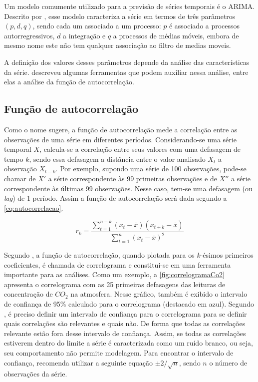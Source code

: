 \documentclass[
    12pt,
    oneside,
    a4paper,
    english,
    brazil
]{abntex2}
\begin{document}
Um modelo comumente utilizado para a  previsão de séries temporais é o ARIMA\@.
Descrito por  , esse  modelo caracteriza a  série em  termos de
três  parâmetros $(p,d,q)$,  sendo  cada  um associado  a  um  processo: $p$  é
associado a processos  autorregressivos, $d$ a integração e $q$  a processos de
médias móveis, embora de mesmo nome  este não tem qualquer associação ao filtro
de medias moveis.

A   definição  dos   valores   desses  parâmetros   depende   da  análise   das
características da  série.   descreveu algumas  ferramentas que
podem auxiliar nessa análise, entre elas a análise da função de autocorrelação.

\subsection{Função de autocorrelação}\label{sec:corre}

Como  o nome  sugere, a  função de  autocorrelação mede  a correlação  entre as
observações  de uma  série em  diferentes períodos.  Considerando-se uma  série
temporal $X$, calcula-se  a correlação entre seus valores com  uma defasagem de
tempo $k$,  sendo essa defasagem  a distância entre  o valor analisado  $X_t$ a
observação  $X_{t-k}$.  Por exemplo,  supondo  uma  série de  100  observações,
pode-se chamar de $X'$ a série  correspondente às 99 primeiras observações e de
$X''$ a série correspondente às últimas  99 observações. Nesse caso, tem-se uma
defasagem (ou \textit{lag}) de 1 período. Assim a função de autocorrelação será
dada segundo a \autoref{eq:autocorrelacao}.

\begin{equation}
    \label{eq:autocorrelacao}
    r_k = \frac{\sum_{t=1}^{n-k}{(x_t - \overline{x})(x_{t+k} -
    \overline{x})}}{\sum_{t=1}^{n}{(x_t - \overline{x})^2}}
\end{equation}

Segundo  ,  a  função   de  autocorrelação,  quando  plotada
para  os  $k$-ésimos  primeiros  coeficientes,  é  chamada  de  correlograma  e
constitui-se em uma ferramenta importante para  as análises. Como um exemplo, a
\autoref{fig:correlogramaCo2}  apresenta o  correlograma  com  as 25  primeiras
defasagens das leituras de concentração  de $CO_2$ na atmosfera. Nesse gráfico,
também é exibido o intervalo de confiança de 95\% calculado para o correlograma
(destacado  em  azul).  Segundo   ,  é  preciso  definir  um
intervalo de  confiança para o  correlograma para se definir  quais correlações
são relevantes e  quais não. De forma que todas  as correlações relevante estão
fora desse  intervalo de  confiança. Assim, se  todas as  correlações estiverem
dentro do  limite a série  é caracterizada como um  ruído branco, ou  seja, seu
comportamento não permite  modelagem. Para encontrar o  intervalo de confiança,
  recomenda utilizar  a seguinte  equação $\pm{}2/\sqrt{n}$,
sendo $n$ o número de observações da série.
\end{document}
